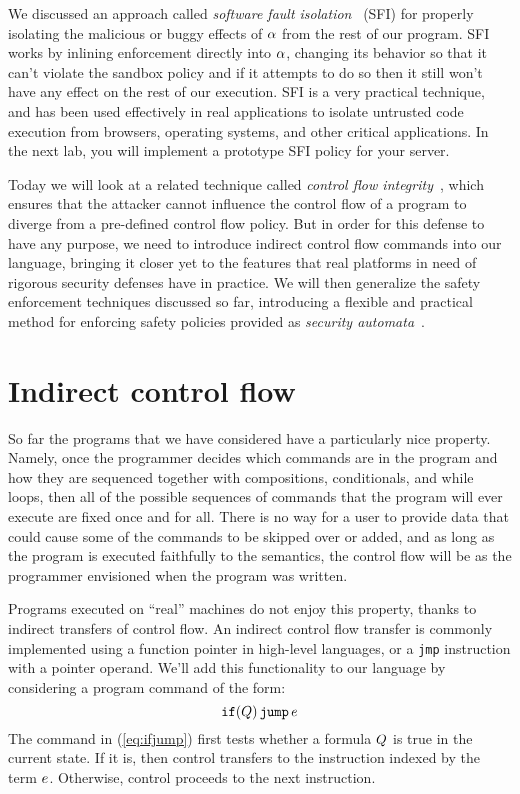 \documentclass[11pt,twoside]{scrartcl}
\begin{document}
We discussed an approach called \emph{software fault isolation}~\cite{Sehr2010,Yee2009} (SFI) for properly isolating the malicious or buggy effects of $\alpha$ from the rest of our program. SFI works by inlining enforcement directly into $\alpha$, changing its behavior so that it can't violate the sandbox policy and if it attempts to do so then it still won't have any effect on the rest of our execution. SFI is a very practical technique, and has been used effectively in real applications to isolate untrusted code execution from browsers, operating systems, and other critical applications. In the next lab, you will implement a prototype SFI policy for your server.

Today we will look at a related technique called \emph{control flow integrity}~\cite{Abadi2009}, which ensures that the attacker cannot influence the control flow of a program to diverge from a pre-defined control flow policy. But in order for this defense to have any purpose, we need to introduce indirect control flow commands into our language, bringing it closer yet to the features that real platforms in need of rigorous security defenses have in practice. We will then generalize the safety enforcement techniques discussed so far, introducing a flexible and practical method for enforcing safety policies provided as \emph{security automata}~\cite{Schneider2000}.


\section{Indirect control flow}
So far the programs that we have considered have a particularly nice property. Namely, once the programmer decides which commands are in the program and how they are sequenced together with compositions, conditionals, and while loops, then all of the possible sequences of commands that the program will ever execute are fixed once and for all. There is no way for a user to provide data that could cause some of the commands to be skipped over or added, and as long as the program is executed faithfully to the semantics, the control flow will be as the programmer envisioned when the program was written.

Programs executed on ``real'' machines do not enjoy this property, thanks to indirect transfers of control flow. An indirect control flow transfer is commonly implemented using a function pointer in high-level languages, or a \verb'jmp' instruction with a pointer operand. We'll add this functionality to our language by considering a program command of the form:
\begin{equation}
\label{eq:ifjump}
\pifjump{\ivr}{\astrm}
\end{equation}
The command in (\ref{eq:ifjump}) first tests whether a formula $Q$ is true in the current state. If it is, then control transfers to the instruction indexed by the term $e$. Otherwise, control proceeds to the next instruction.
\end{document}
